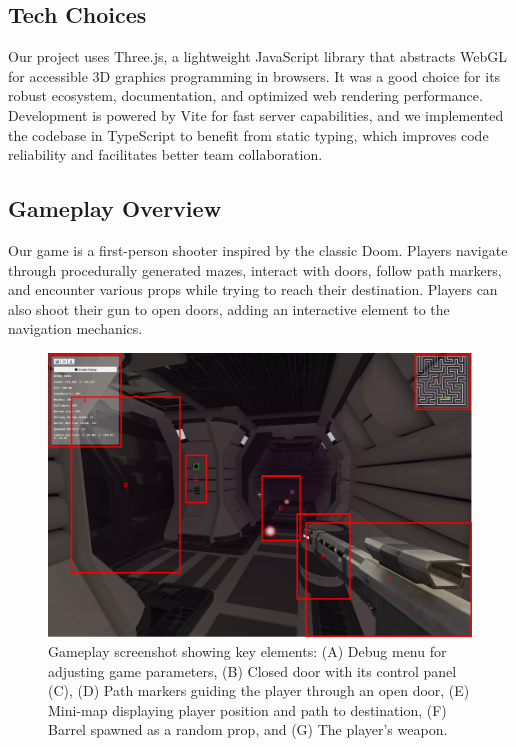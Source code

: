 \documentclass{article}
\begin{document}
\subsection{Tech Choices}
Our project uses Three.js, a lightweight JavaScript library that abstracts WebGL for accessible 3D graphics programming in browsers. It was a good choice for its robust ecosystem, documentation, and optimized web rendering performance. Development is powered by Vite for fast server capabilities, and we implemented the codebase in TypeScript to benefit from static typing, which improves code reliability and facilitates better team collaboration.

\subsection{Gameplay Overview}
Our game is a first-person shooter inspired by the classic Doom. Players navigate through procedurally generated mazes, interact with doors, follow path markers, and encounter various props while trying to reach their destination. Players can also shoot their gun to open doors, adding an interactive element to the navigation mechanics.

\begin{figure}[H]
    \centering
    \includegraphics[width=\textwidth]{diagrams/screenshot.png}
    \caption{Gameplay screenshot showing key elements: (A) Debug menu for adjusting game parameters, (B) Closed door with its control panel (C), (D) Path markers guiding the player through an open door, (E) Mini-map displaying player position and path to destination, (F) Barrel spawned as a random prop, and (G) The player's weapon.}
    \label{fig:gameplay-overview}
\end{figure}
\end{document}
